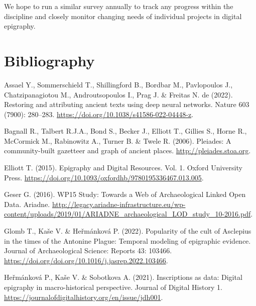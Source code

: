 \documentclass[
  12pt,
]{scrreprt}
\newlength{\cslhangindent}
\newlength{\cslentryspacingunit} %
\newenvironment{CSLReferences}[2] %
 {%
  \setlength{\parindent}{0pt}
  \ifodd #1
  \let\oldpar\par
  \def\par{\hangindent=\cslhangindent\oldpar}
  \fi
  \setlength{\parskip}{#2\cslentryspacingunit}
 }%
 {}
\begin{document}
We hope to run a similar survey annually to track any progress within
the discipline and closely monitor changing needs of individual projects
in digital epigraphy.

\hypertarget{bibliography}{%
\chapter{Bibliography}\label{bibliography}}

\hypertarget{refs}{}
\begin{CSLReferences}{1}{0}
\leavevmode{}%
Assael Y., Sommerschield T., Shillingford B., Bordbar M., Pavlopoulos
J., Chatzipanagiotou M., Androutsopoulos I., Prag J. \& Freitas N. de
(2022). Restoring and attributing ancient texts using deep neural
networks. Nature 603 (7900): 280--283.
\url{https://doi.org/10.1038/s41586-022-04448-z}.

\leavevmode{}%
Bagnall R., Talbert R.J.A., Bond S., Becker J., Elliott T., Gillies S.,
Horne R., McCormick M., Rabinowitz A., Turner B. \& Twele R. (2006).
Pleiades: {A} community-built gazetteer and graph of ancient places.
\url{http://pleiades.stoa.org}.

\leavevmode{}%
Elliott T. (2015). Epigraphy and {Digital} {Resources}. Vol. 1. Oxford
University Press.
\url{https://doi.org/10.1093/oxfordhb/9780195336467.013.005}.

\leavevmode{}%
Geser G. (2016). {WP15} {Study}: {Towards} a {Web} of {Archaeological}
{Linked} {Open} {Data}. Ariadne.
\url{http://legacy.ariadne-infrastructure.eu/wp-content/uploads/2019/01/ARIADNE_archaeological_LOD_study_10-2016.pdf}.

\leavevmode{}%
Glomb T., Kaše V. \& Heřmánková P. (2022). Popularity of the cult of
{Asclepius} in the times of the {Antonine} {Plague}: {Temporal} modeling
of epigraphic evidence. Journal of Archaeological Science: Reports 43:
103466. \url{https://doi.org/doi.org/10.1016/j.jasrep.2022.103466}.

\leavevmode{}%
Heřmánková P., Kaše V. \& Sobotkova A. (2021). Inscriptions as data:
Digital epigraphy in macro-historical perspective. Journal of Digital
History 1. \url{https://journalofdigitalhistory.org/en/issue/jdh001}.


\end{CSLReferences}
\end{document}
